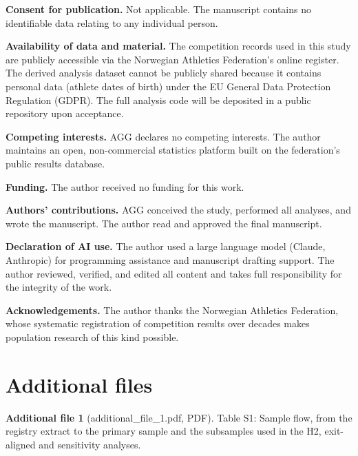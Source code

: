 \documentclass[12pt,a4paper]{article}
\begin{document}
\medskip\noindent\textbf{Consent for publication.} Not applicable. The manuscript contains no identifiable data relating to any individual person.

\medskip\noindent\textbf{Availability of data and material.} The competition records used in this study are publicly accessible via the Norwegian Athletics Federation's online register. The derived analysis dataset cannot be publicly shared because it contains personal data (athlete dates of birth) under the EU General Data Protection Regulation (GDPR). The full analysis code will be deposited in a public repository upon acceptance.

\medskip\noindent\textbf{Competing interests.} AGG declares no competing interests. The author maintains an open, non-commercial statistics platform built on the federation's public results database.

\medskip\noindent\textbf{Funding.} The author received no funding for this work.

\medskip\noindent\textbf{Authors' contributions.} AGG conceived the study, performed all analyses, and wrote the manuscript. The author read and approved the final manuscript.

\medskip\noindent\textbf{Declaration of AI use.} The author used a large language model (Claude, Anthropic) for programming assistance and manuscript drafting support. The author reviewed, verified, and edited all content and takes full responsibility for the integrity of the work.

\medskip\noindent\textbf{Acknowledgements.} The author thanks the Norwegian Athletics Federation, whose systematic registration of competition results over decades makes population research of this kind possible.


\section*{Additional files}

\noindent\textbf{Additional file 1} (additional\_file\_1.pdf, PDF). Table S1: Sample flow, from the registry extract to the primary sample and the subsamples used in the H2, exit-aligned and sensitivity analyses.




\end{document}

